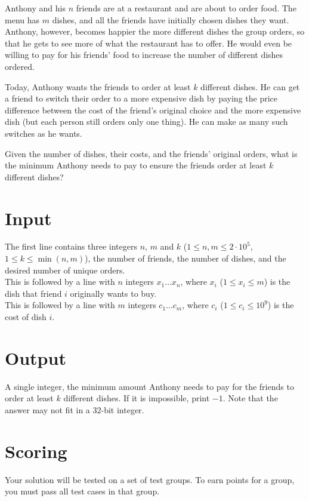 Anthony and his $n$ friends are at a restaurant and are about to order food. The menu has $m$ dishes, and all the friends have initially chosen dishes they want. Anthony, however, becomes happier the more different dishes the group orders, so that he gets to see more of what the restaurant has to offer. He would even be willing to pay for his friends' food to increase the number of different dishes ordered.

Today, Anthony wants the friends to order at least $k$ different dishes. He can get a friend to switch their order to a more expensive dish by paying the price difference between the cost of the friend's original choice and the more expensive dish (but each person still orders only one thing). He can make as many such switches as he wants.

Given the number of dishes, their costs, and the friends' original orders, what is the minimum Anthony needs to pay to ensure the friends order at least $k$ different dishes?

\section*{Input}
The first line contains three integers $n$, $m$ and $k$ ($1 \leq n, m \leq 2 \cdot 10^5$, $1 \le k \le \min(n, m)$), the number of friends, the number of dishes, and the desired number of unique orders. \\
This is followed by a line with $n$ integers $x_1 \dots x_n$, where $x_i$ ($1 \leq x_i \leq m$) is the dish that friend $i$ originally wants to buy. \\
This is followed by a line with $m$ integers $c_1 \dots c_m$, where $c_i$ ($1 \leq c_i \leq 10^9$) is the cost of dish $i$.

\section*{Output}
A single integer, the minimum amount Anthony needs to pay for the friends to order at least $k$ different dishes. If it is impossible, print $-1$. Note that the answer may not fit in a $32$-bit integer.

\section*{Scoring}
Your solution will be tested on a set of test groups.
To earn points for a group, you must pass all test cases in that group.

